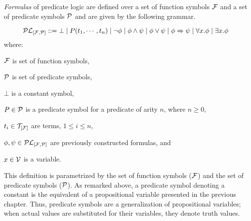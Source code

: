 \documentclass[11pt]{article}
\begin{document}
\begin{definition}
{\em{Formulas}} of predicate logic are defined over
a set of function symbols ${\cal{F}}$ and a set of predicate symbols
${\cal{P}}$ and are given by the following grammar.

\[{\cal{PL}}_{[{\cal{F}},{\cal{P}}]} ::= \bot \;|\;  P(t_1,\cdots,t_n) \; | \; \neg\phi \; | \; \phi \wedge\psi \; | \; \phi \vee\psi \; | \; \phi \Rightarrow\psi \; | \; \forall{}x.\phi \; | \; \exists{}x.\phi\]
where: \vspace{-.06125in}
\begin{description}
\item{{\hspace{.25in}}${\cal{F}}$} is set of function symbols, \vspace{-.5em}
\item{{\hspace{.25in}}${\cal{P}}$} is set of predicate symbols, \vspace{-.5em}
\item{{\hspace{.25in}}$\bot$} is a constant symbol,  \vspace{-.5em}
\item{{\hspace{.25in}}$P\in{\cal{P}}$} is a predicate symbol for a predicate of arity $n$, where $n\ge{}0$,  \vspace{-.5em}
\item{{\hspace{.25in}}$t_i\in{\cal{T}}_{[{\cal{F}}]}$} are terms, $1\le{}i\le{}n$,  \vspace{-.5em}
\item{{\hspace{.25in}}$\phi,\psi\in{\cal{PL}}_{[{\cal{F}},{\cal{P}}]}$} are previously constructed formulas, and  \vspace{-.5em}
\item{{\hspace{.25in}}$x\in{\cal{V}}$} is a variable.
\end{description}
\end{definition}

This definition is parametrized by the set of function symbols (${\cal{F}}$)
and the set of predicate symbols (${\cal{P}}$).  As remarked above, a predicate
symbol denoting a constant is the equivalent of a propositional variable
presented in the previous chapter.  Thus, predicate symbols are a
generalization of propositional variables; when actual values are substituted
for their variables, they denote truth values.
\end{document}
